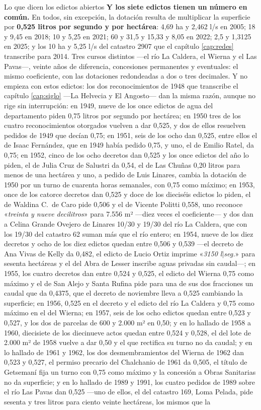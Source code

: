 \begin{ficha}{Lo que dicen los edictos abiertos}
\textbf{Y los siete edictos tienen un número en común.} En todos, sin excepción, la dotación
resulta de multiplicar la superficie por \textbf{0,525 litros por segundo y por hectárea}:
4,69 ha y 2,462 l/s en 2005; 18 y 9,45 en 2018; 10 y 5,25 en 2021; 60 y 31,5 y 15,33 y 8,05
en 2022; 2,5 y 1,3125 en 2025; y los 10 ha y 5,25 l/s del catastro 2907 que el capítulo
\ref{cap:redes} transcribe para 2014. Tres cursos distintos ---el río La Caldera, el Wierna
y el Las Pavas---, veinte años de diferencia, concesiones permanentes
y eventuales: el mismo coeficiente, con las dotaciones redondeadas a dos o tres decimales. Y no empieza con estos edictos: los dos reconocimientos de 1948 que transcribe el capítulo \ref{cap:siglo} ---La Helvecia y El Angosto--- dan la misma razón, aunque no rige sin interrupción: en 1949, nueve de los once edictos de agua del departamento piden 0,75 litros por segundo por hectárea; en 1950 tres de los cuatro reconocimientos otorgados vuelven a dar 0,525, y dos de ellos resuelven pedidos de 1949 que decían 0,75; en 1951, seis de los ocho dan 0,525, entre ellos el de Isaac Fernández, que en 1949 había pedido 0,75, y uno, el de Emilio Ratel, da 0,75; en 1952, cinco de los ocho decretos dan 0,525 y los once edictos del año lo piden, el de Julia Cruz de Salustri da 0,54, el de Las Chuñas 0,20 litros para menos de una hectárea y uno, a pedido de Luis Linares, cambia la dotación de 1950 por un turno de cuarenta horas semanales, con 0,75 como máximo; en 1953, once de los catorce decretos dan 0,525 y doce de los dieciséis edictos lo piden, el de Waldina C.\ de Caro pide 0,506 y el de Vicente Politti 0,558, uno reconoce «\textit{treinta y nueve decilitros}» para 7.556 m² ---diez veces el coeficiente--- y dos dan a Celina Grande Ovejero de Linares 10/30 y 19/30 del río La Caldera, que con los 19/30 del catastro 62 suman más que el río entero; en 1954, nueve de los diez decretos y ocho de los diez edictos quedan entre 0,506 y 0,539 ---el decreto de Ana Vivas de Kelly da 0,482, el edicto de Lucio Ortiz imprime «\textit{3150 l$|$seg.}» para sesenta hectáreas y el del Abra de Lesser inscribe aguas privadas sin caudal---; en 1955, los cuatro decretos dan entre 0,524 y 0,525, el edicto del Wierna 0,75 como máximo y el de San Alejo y Santa Rufina pide para una de sus dos fracciones un caudal que da 0,4375, que el decreto de noviembre lleva a 0,525 cambiando la superficie; en 1956, 0,525 en el decreto y el edicto del río La Caldera y 0,75 como máximo en el del Wierna; en 1957, seis de los ocho edictos quedan entre 0,523 y 0,527, y los dos de parcelas de 600 y 2.000 m² en 0,50; y en lo hallado de 1958 a 1960, diecisiete de los diecinueve actos quedan entre 0,524 y 0,528, el del lote de 2.000 m² de 1958 vuelve a dar 0,50 y el que rectifica su turno no da caudal; y en lo hallado de 1961 y 1962, los dos desmembramientos del Wierna de 1962 dan 0,523 y 0,527, el permiso precario del Chalchanio de 1961 da 0,505, el título de Getsemaní fija un turno con 0,75 como máximo y la concesión a Obras Sanitarias no da superficie; y en lo hallado de 1989 y 1991, los cuatro pedidos de 1989 sobre el río Las Pavas dan 0,525 ---uno de ellos, el del catastro 169, Loma Pelada, pide sesenta y tres litros para ciento veinte hectáreas, los mismos que la 
\end{ficha}
